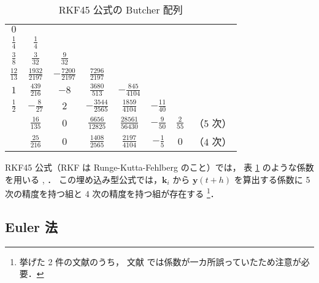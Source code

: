 \begin{table}[bp]
    \caption{RKF45 公式の Butcher 配列}
    \label{table:ode_runge-kutta_butcher-array-rkf45}
    \centering
    \begin{tabular}{c|ccccccc}
        $0$             &                     &                      &                      &                       &                  &                &          \\
        $\frac{1}{4}$   & $\frac{1}{4}$       &                      &                      &                       &                  &                &          \\
        $\frac{3}{8}$   & $\frac{3}{32}$      & $\frac{9}{32}$       &                      &                       &                  &                &          \\
        $\frac{12}{13}$ & $\frac{1932}{2197}$ & $-\frac{7200}{2197}$ & $\frac{7296}{2197}$  &                       &                  &                &          \\
        $1$             & $\frac{439}{216}$   & $-8$                 & $\frac{3680}{513}$   & $-\frac{845}{4104}$   &                  &                &          \\
        $\frac{1}{2}$   & $-\frac{8}{27}$     & $2$                  & $-\frac{3544}{2565}$ & $\frac{1859}{4104}$   & $-\frac{11}{40}$ &                &          \\
        \hline
                        & $\frac{16}{135}$    & $0$                  & $\frac{6656}{12825}$ & $\frac{28561}{56430}$ & $-\frac{9}{50}$  & $\frac{2}{55}$ & （5 次） \\
                        & $\frac{25}{216}$    & $0$                  & $\frac{1408}{2565}$  & $\frac{2197}{4104}$   & $-\frac{1}{5}$   & $0$            & （4 次）
    \end{tabular}
\end{table}

RKF45 公式（RKF は Runge-Kutta-Fehlberg のこと）では，
表 \ref{table:ode_runge-kutta_butcher-array-rkf45} のような係数を用いる
\cite[4.1 節 (a)]{Mitsui1993}, \cite[Section 9.5]{Mathews2004}．
この埋め込み型公式では，$\bm{k}_i$ から $\bm{y}(t + h)$ を算出する係数に
5 次の精度を持つ組と 4 次の精度を持つ組が存在する
\footnote{挙げた 2 件の文献のうち，%
    文献 \cite{Mitsui1993} では係数が一カ所誤っていたため注意が必要．}．

\subsection{Euler 法}

